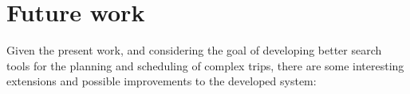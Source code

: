 \section{Future work}








Given the present work, and considering the goal of developing better search tools for the planning and scheduling of complex trips, there are some interesting extensions and possible improvements to the developed system:

